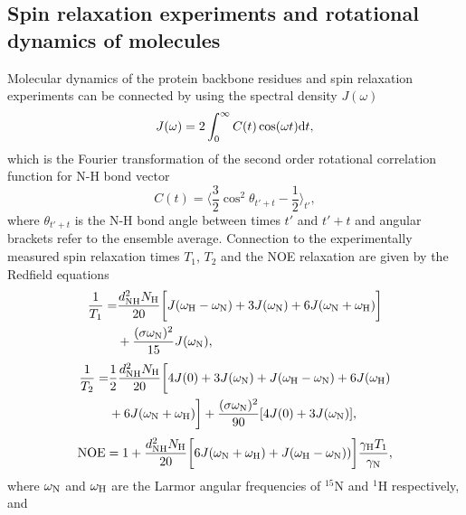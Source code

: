 \documentclass[pre,aps,floatfix,authordate1-4,twocolumn]{revtex4-1}
\begin{document}
\subsection{Spin relaxation experiments and rotational dynamics of molecules}
Molecular dynamics of the protein backbone residues and spin relaxation experiments can
be connected by using the spectral density $J(\omega)$ 
\begin{equation}\label{SPECTdens}
  J(\omega)=2\int_0^\infty C(t) \cos(\omega t) {\rm d}t,
\end{equation}
which is the Fourier transformation of the second order
rotational correlation function for N-H bond vector
\begin{equation}\label{CORRFdef}
  C(t)=\langle \frac{3}{2}\cos^2\theta_{t'+t}-\frac{1}{2} \rangle_{t'},
\end{equation}
where $\theta_{t'+t}$ is the N-H bond angle between times $t'$ and $t'+t$
and angular brackets refer to the ensemble average.
Connection to the experimentally measured spin relaxation times $T_1$, $T_2$
and the NOE relaxation are given by the Redfield equations~\cite{abragam,kay89}
\begin{equation}\label{R1}
  \begin{aligned}
  \frac{1}{T_1}= & \frac{d_{\rm{NH}}^2N_{\rm{H}}}{20}\bigg[J(\omega_{\rm{H}}-\omega_{\rm{N}})+3J(\omega_{\rm{N}})+6J(\omega_{\rm{N}}+\omega_{\rm{H}})\bigg] \\
        & +\frac{(\sigma \omega_{\rm{N}})^2}{15}J(\omega_{\rm{N}}),
  \end{aligned}
\end{equation}
\begin{equation}\label{R2}
    \begin{aligned}
  \frac{1}{T_2}= & \frac{1}{2}\frac{d_{\rm{NH}}^2N_{\rm{H}}}{20}\bigg[4J(0)+3J(\omega_{\rm{N}})+J(\omega_{\rm{H}}-\omega_{\rm{N}})+6J(\omega_{\rm{H}})  \\
    & +6J(\omega_{\rm{N}}+\omega_{\rm{H}})\bigg]+\frac{(\sigma \omega_{\rm{N}})^2}{90}[4J(0) +3J(\omega_{\rm{N}})],
    \end{aligned}
\end{equation}
\begin{equation}\label{NOE}
  {\rm NOE}=1+\frac{d_{\rm{NH}}^2N_{\rm{H}}}{20}\bigg[6J(\omega_{\rm{N}}+\omega_{\rm{H}})+J(\omega_{\rm{H}}-\omega_{\rm{N}}))\bigg]\frac{\gamma_{\rm{H}}T_1}{\gamma_{\rm{N}}},
\end{equation}
where $\omega_{\rm{N}}$ and $\omega_{\rm{H}}$ are the Larmor angular
frequencies of $^{15}$N and $^1$H respectively, and
\end{document}
